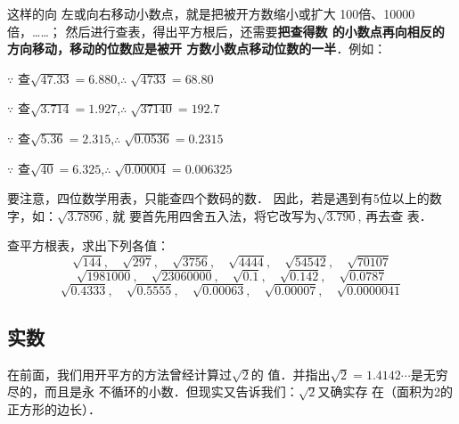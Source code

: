 这样的向
    左或向右移动小数点，就是把被开方数缩小或扩大
    100倍、10000倍，……；
然后进行查表，得出平方根后，还需要\textbf{把查得数
的小数点再向相反的方向移动，移动的位数应是被开
方数小数点移动位数的一半}．例如：
\begin{center}
\end{center}

$\because$ 查$\sqrt{47.33}=6.880$,\qquad $\therefore\; \sqrt{4733}=68.80$

$\because$ 查$\sqrt{3.714}=1.927$,\qquad $\therefore\; \sqrt{37140}=192.7$


\begin{center}
\end{center}

$\because$ 查$\sqrt{5.36}=2.315$,\qquad $\therefore\; \sqrt{0.0536}=0.2315$

$\because$ 查$\sqrt{40}=6.325$,\qquad $\therefore\; \sqrt{0.00004}=0.006325$

要注意，四位数学用表，只能查四个数码的数．
因此，若是遇到有5位以上的数字，如：$\sqrt{3.7896}$, 就
要首先用四舍五入法，将它改写为$\sqrt{3.790}$, 再去查
表．

\begin{ex}
    查平方根表，求出下列各值：
\[\sqrt{144},\quad \sqrt{297},\quad \sqrt{3756},\quad \sqrt{4444},\quad \sqrt{54542},\quad \sqrt{70107} \]
\[\sqrt{1981000},\quad \sqrt{23060000},\quad \sqrt{0.1},\quad \sqrt{0.142},\quad \sqrt{0.0787} \]
\[\sqrt{0.4333},\quad \sqrt{0.5555},\quad \sqrt{0.00063},\quad \sqrt{0.00007},\quad \sqrt{0.0000041} \]
\end{ex}

\subsection{实数}
在前面，我们用开平方的方法曾经计算过$\sqrt{2}$的
值．并指出$\sqrt{2}=1.4142\cdots$是无穷尽的，而且是永
不循环的小数．但现实又告诉我们：$\sqrt{2}$又确实存
在（面积为2的正方形的边长）．

